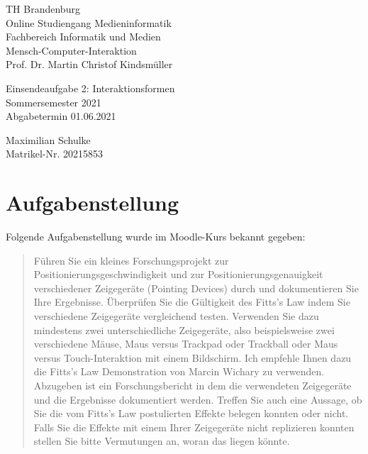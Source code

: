 \documentclass{article}
\begin{document}
\begin{titlepage}
	\begin{flushleft}
		TH Brandenburg \\
		Online Studiengang Medieninformatik \\
		Fachbereich Informatik und Medien \\
		Mensch-Computer-Interaktion \\
		Prof. Dr. Martin Christof Kindsmüller
	\end{flushleft}

	\vfill

	\begin{center}
		\Large{Einsendeaufgabe 2: Interaktionsformen}\\[0.5em]
		\large{Sommersemester 2021}\\[0.25em]
		\large{Abgabetermin 01.06.2021}
	\end{center}

	\vfill

	\begin{flushright}
		Maximilian Schulke \\
		Matrikel-Nr. 20215853
	\end{flushright}
\end{titlepage}

\tableofcontents

\vfill

\section{Aufgabenstellung}

Folgende Aufgabenstellung wurde im Moodle-Kurs bekannt gegeben:

\begin{quote}
	Führen Sie ein kleines Forschungsprojekt zur Positionierungsgeschwindigkeit
	und zur Positionierungsgenauigkeit verschiedener Zeigegeräte (Pointing
	Devices) durch und dokumentieren Sie Ihre Ergebnisse. Überprüfen Sie die
	Gültigkeit des Fitts's Law indem Sie verschiedene Zeigegeräte vergleichend
	testen. Verwenden Sie dazu mindestens zwei unterschiedliche Zeigegeräte,
	also beispielsweise zwei verschiedene Mäuse, Maus versus Trackpad oder
	Trackball oder Maus versus Touch-Interaktion mit einem Bildschirm. Ich
	empfehle Ihnen dazu die Fitts's Law Demonstration von Marcin Wichary zu
	verwenden. Abzugeben ist ein Forschungsbericht in dem die verwendeten
	Zeigegeräte und die Ergebnisse dokumentiert werden. Treffen Sie auch eine
	Aussage, ob Sie die vom Fitts's Law postulierten Effekte belegen konnten
	oder nicht. Falls Sie die Effekte mit einem Ihrer Zeigegeräte nicht
	replizieren konnten stellen Sie bitte Vermutungen an, woran das liegen
	könnte.
\end{quote}
\end{document}

